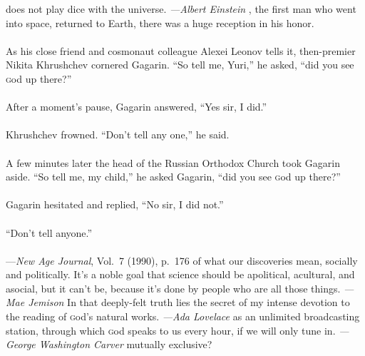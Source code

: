 \newpage
\bversenonum {} does not play dice with the universe. \textit{---Albert Einstein}
\newpage
\bversenonum {}, the first man who went into space, returned to Earth, there was a huge reception in his honor. \\
\\
\bverse As his close friend and cosmonaut colleague Alexei Leonov tells it, then-premier Nikita Khrushchev cornered Gagarin. ``So tell me, Yuri,'' he asked, ``did you see \textsc{g}od up there?'' \\
\\
\bverse After a moment's pause, Gagarin answered, ``Yes sir, I did.'' \\
\\
\bverse Khrushchev frowned. ``Don't tell any one,'' he said. \\
\\
\bverse A few minutes later the head of the Russian Orthodox Church took Gagarin aside. ``So tell me, my child,'' he asked Gagarin, ``did you see \textsc{g}od up there?'' \\
\\
\bverse Gagarin hesitated and replied, ``No sir, I did not.'' \\
\\
\bverse ``Don't tell anyone.'' \\
\\
---\textit{New Age Journal}, Vol.~7 (1990), p.~176
\newpage
\bversenonum {} of what our discoveries mean, socially and politically. It's a noble goal that science should be apolitical, acultural, and asocial, but it can't be, because it's done by people who are all those things. \textit{---Mae Jemison}
\newpage
\bversenonum {} In that deeply-felt truth lies the secret of my intense devotion to the reading of \textsc{g}od's natural works. \textit{---Ada Lovelace}
\newpage
\bversenonum {} as an unlimited broadcasting station, through which \textsc{g}od speaks to us every hour, if we will only tune in. \textit{---George Washington Carver}
\newpage
\bversenonum {} mutually exclusive?
\newpage


